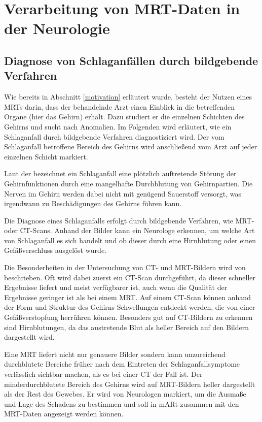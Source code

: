 \section{Verarbeitung von MRT-Daten in der Neurologie}						 %
 
\subsection{Diagnose von Schlaganf\"allen durch bildgebende Verfahren}
\label{schalganfaelleMRT}

Wie bereits in Abschnitt \ref{motivation} erläutert wurde, besteht der Nutzen eines MRTs darin, dass der behandelnde Arzt einen Einblick in die betreffenden Organe (hier das Gehirn) erhält. Dazu studiert er die einzelnen Schichten des Gehirns und sucht nach Anomalien.
Im Folgenden wird erläutert, wie ein Schlaganfall durch bildgebende Verfahren diagnostiziert wird.
Der vom Schlaganfall betroffene Bereich des Gehirns wird anschließend vom Arzt auf jeder einzelnen Schicht markiert.

Laut der \cite{schlaganfall} bezeichnet ein Schlaganfall eine plötzlich auftretende Störung der Gehirnfunktionen durch eine mangelhafte Durchblutung von Gehirnpartien. Die Nerven im Gehirn werden dabei nicht mit genügend Sauerstoff versorgt, was irgendwann zu Beschädigungen des Gehirns führen kann.

Die Diagnose eines Schlaganfalls erfolgt durch bildgebende Verfahren, wie MRT- oder CT-Scans. Anhand der Bilder kann ein Neurologe erkennen, um welche Art von Schlaganfall es sich handelt und ob dieser durch eine Hirnblutung oder einen Gefäßverschluss ausgelöst wurde. 

Die Besonderheiten in der Untersuchung von CT- und MRT-Bildern wird von \cite{schlaganfallBilder} beschrieben.
Oft wird dabei zuerst ein CT-Scan durchgeführt, da dieser schneller Ergebnisse liefert und meist verfügbarer ist, auch wenn die Qualität der Ergebnisse geringer ist als bei einem MRT. 
Auf einem CT-Scan können anhand der Form und Struktur des Gehirns Schwellungen entdeckt werden, die von einer Gefäßverstopfung herrühren können. Besonders gut auf CT-Bildern zu erkennen sind Hirnblutungen, da das austretende Blut als heller Bereich auf den Bildern dargestellt wird. 

Eine MRT liefert nicht nur genauere Bilder sondern kann unzureichend durchblutete Bereiche früher nach dem Eintreten der Schlaganfallsymptome verlässlich sichtbar machen, als es bei einer CT der Fall ist.
Der minderdurchblutete Bereich des Gehirns wird auf MRT-Bildern heller dargestellt als der Rest des Gewebes. Er wird von Neurologen markiert, um die Ausmaße und Lage des Schadens zu bestimmen und soll in mARt zusammen mit den MRT-Daten angezeigt werden können.

